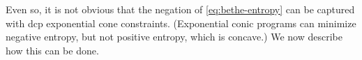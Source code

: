 \documentclass{article}
\begin{document}
Even so,
it is not obvious that
the negation of \eqref{eq:bethe-entropy} can be
captured with dcp exponential cone constraints.
(Exponential conic programs can minimize negative entropy,
 but not positive entropy, which is concave.)
We now describe how this can be done.

\def\Par{\mathrm{Par}}
\def\Pash{\mathit{V\mskip-5muC\mskip-3.5muP\!}}
\end{document}
